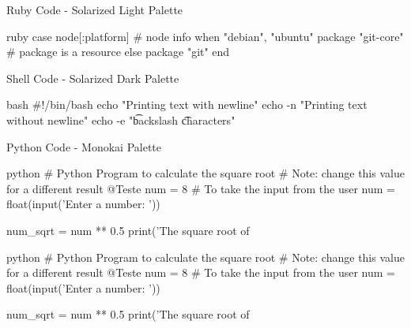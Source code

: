 \documentclass[aspectratio=169]{beamer} %
\begin{document}
\begin{SliTC}{Ruby Code - Solarized Light Palette}
  \begin{CodeL}{ruby}
case node[:platform] # node info
when "debian", "ubuntu"
  package "git-core" # package is a resource
else 
  package "git"
end
  \end{CodeL}
\end{SliTC}

\begin{SliTC}{Shell Code - Solarized Dark Palette}
  \begin{CodeD}{bash}
#!/bin/bash
echo "Printing text with newline"
echo -n "Printing text without newline"
echo -e "\nRemoving \t backslash \t characters\n"
  \end{CodeD}
\end{SliTC}

\begin{SliTC}{Python Code - Monokai Palette}
  \begin{CodeM}{python}
# Python Program to calculate the square root
# Note: change this value for a different result
@Teste
num = 8 
# To take the input from the user
num = float(input('Enter a number: '))

num_sqrt = num ** 0.5
print('The square root of %
  \end{CodeM}
\end{SliTC}


\begin{BlackC}
  \begin{CodeM}{python}
# Python Program to calculate the square root
# Note: change this value for a different result
@Teste
num = 8 
# To take the input from the user
num = float(input('Enter a number: '))

num_sqrt = num ** 0.5
print('The square root of %
  \end{CodeM}
\end{BlackC}


%
\end{document}
